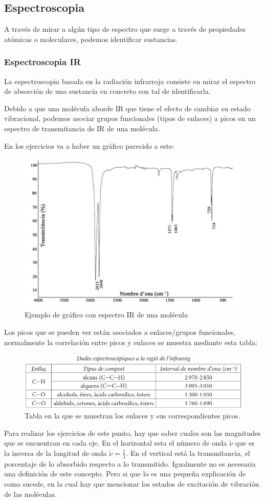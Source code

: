 \documentclass[arial,a4paper,print]{article}
\begin{document}
\subsection{Espectroscopia}
A través de mirar a algún tipo de espectro que surge a través de propiedades atómicas o moleculares, podemos identificar sustancias. 

\subsubsection{Espectroscopia IR}
La espectroscopia basada en la radiación infrarroja consiste en mirar el espectro de absorción de una sustancia en concreto con tal de identificarla.  

Debido a que una molécula aborde IR que tiene el efecto de cambiar su estado vibracional, podemos asociar grupos funcionales (tipos de enlaces) a picos en un espectro de transmitancia de IR de una molécula. 

En los ejercicios va a haber un gráfico parecido a este:
\begin{figure}[H]
	\centering
	\includegraphics[width=0.5\linewidth]{figures/IR}
	\caption{Ejemplo de gráfico con espectro IR de una molécula}
	\label{fig:ir}
\end{figure}

Los picos que se pueden ver están asociados a enlaces/grupos funcionales, normalmente la correlación entre picos y enlaces se muestra mediante esta tabla:
\begin{figure}[H]
	\centering
	\includegraphics[width=0.7\linewidth]{figures/tabla_IR}
	\caption{Tabla en la que se muestran los enlaces y sus correspondientes picos.}
	\label{fig:tablair}
\end{figure}

Para realizar los ejercicios de este punto, hay que saber cuales son las magnitudes que se encuentran en cada eje. En el horizontal esta el número de onda $\tilde{\nu}$ que es la inversa de la longitud de onda $\tilde{\nu} = \frac{1}{\lambda}$. En el vertical está la transmitancia, el porcentaje de lo absorbido respecto a lo transmitido. Igualmente no es necesaria una definición de este concepto.  Pero si que lo es una pequeña explicación de como sucede, en la cual hay que mencionar los estados de excitación de vibración de las moléculas.  
\end{document}
